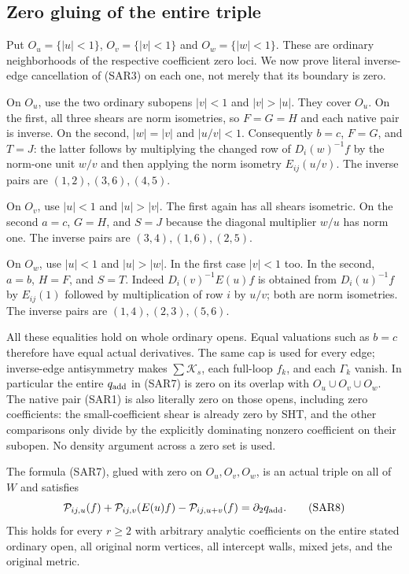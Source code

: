 \subsection{Zero gluing of the entire triple}

Put $O_u=\{|u|<1\}$, $O_v=\{|v|<1\}$ and $O_w=\{|w|<1\}$.
These are ordinary neighborhoods of the respective coefficient
zero loci.  We now prove literal inverse-edge cancellation of
(SAR3) on each one, not merely that its boundary is zero.

On $O_u$, use the two ordinary subopens $|v|<1$ and $|v|>|u|$.
They cover $O_u$.  On the first, all three shears are norm
isometries, so $F=G=H$ and each native pair is inverse.  On the
second, $|w|=|v|$ and $|u/v|<1$.  Consequently $b=c$, $F=G$,
and $T=J$: the latter follows by multiplying the changed row
of $D_i(w)^{-1}f$ by the norm-one unit $w/v$ and then applying
the norm isometry $E_{ij}(u/v)$.  The inverse pairs are
$(1,2),(3,6),(4,5)$.

On $O_v$, use $|u|<1$ and $|u|>|v|$.  The first again has all
shears isometric.  On the second $a=c$, $G=H$, and $S=J$
because the diagonal multiplier $w/u$ has norm one.  The inverse
pairs are $(3,4),(1,6),(2,5)$.

On $O_w$, use $|u|<1$ and $|u|>|w|$.  In the first case
$|v|<1$ too.  In the second, $a=b$, $H=F$, and $S=T$.
Indeed $D_i(v)^{-1}E(u)f$ is obtained from $D_i(u)^{-1}f$
by $E_{ij}(1)$ followed by multiplication of row $i$ by $u/v$;
both are norm isometries.  The inverse pairs are
$(1,4),(2,3),(5,6)$.

All these equalities hold on whole ordinary opens.  Equal
valuations such as $b=c$ therefore have equal actual derivatives.
The same cap is used for every edge; inverse-edge antisymmetry
makes $\sum\mathcal K_s$, each full-loop $f_k$, and each
$\Gamma_k$ vanish.  In particular the entire $q_{\rm add}$ in
(SAR7) is zero on its overlap with $O_u\cup O_v\cup O_w$.
The native pair (SAR1) is also literally zero on those opens,
including zero coefficients: the small-coefficient shear is
already zero by SHT, and the other comparisons only divide by
the explicitly dominating nonzero coefficient on their subopen.
No density argument across a zero set is used.

\begin{theorem}
The formula (SAR7), glued with zero on $O_u,O_v,O_w$, is an
actual triple on all of $W$ and satisfies
\[
 \mathcal P_{ij,u}(f)+\mathcal P_{ij,v}(E(u)f)
                   -\mathcal P_{ij,u+v}(f)=\partial_2q_{\rm add}.
 \tag{SAR8}
\]
This holds for every $r\ge2$ with arbitrary analytic coefficients
on the entire stated ordinary open, all original norm vertices,
all intercept walls, mixed jets, and the original metric.
\end{theorem}

